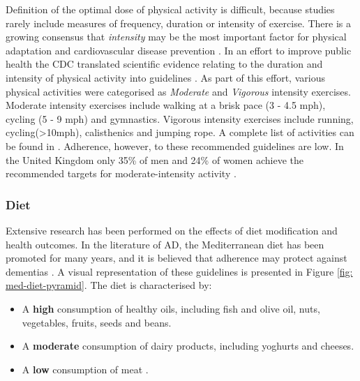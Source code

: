 Definition of the optimal dose of physical activity is difficult, because studies rarely include measures of frequency, duration or intensity of exercise. There is a growing consensus that \textit{intensity} may be the most important factor for physical adaptation and cardiovascular disease prevention \cite{Kaminsky2014,Wilson2015,Weston2014}. In an effort to improve public health the CDC translated scientific evidence relating to the duration and intensity of physical activity into guidelines \cite{CDC_translating}. As part of this effort, various physical activities were categorised as \textit{Moderate} and \textit{Vigorous} intensity exercises. Moderate intensity exercises include walking at a brisk pace (3 - 4.5 mph), cycling (5 - 9 mph) and gymnastics. Vigorous intensity exercises include running, cycling(\textgreater 10mph), calisthenics and jumping rope. A complete list of activities can be found in \cite{cdcpaguidelines2008}.
Adherence, however, to these recommended guidelines are low. In the United Kingdom only 35\% of men and 24\% of women achieve the recommended targets for moderate-intensity activity \cite{Miles2007}.

\subsubsection{Diet}
Extensive research has been performed on the effects of diet modification and health outcomes. In the literature of AD, the Mediterranean diet has been promoted for many years, and it is believed that adherence may protect against dementias \cite{Trichopoulou2014, Psaltopoulou2013}. A visual representation of these guidelines is presented in Figure \ref{fig: med-diet-pyramid}. The diet is characterised by:
\begin{itemize}
\item A \textbf{high} consumption of healthy oils, including fish and olive oil, nuts, vegetables, fruits, seeds and beans.
\item A \textbf{moderate} consumption of dairy products, including yoghurts and cheeses.
\item A \textbf{low} consumption of meat \cite{Gu2010a}.
\end{itemize}

